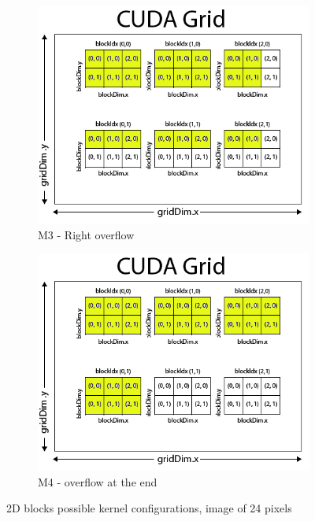 \documentclass[a4paper]{article}
\begin{document}
\begin{figure}[!ht]
\begin{subfigure}{0.5\textwidth}
\centering
\includegraphics[width=\linewidth]{res/M3}
\caption{M3 - Right overflow}
\label{fig:m3}
\end{subfigure}
\begin{subfigure}{0.5\textwidth}
\centering
\includegraphics[width=\linewidth]{res/M4}
\caption{M4 - overflow at the end}
\label{fig:m4}
\end{subfigure}
\caption{2D blocks possible kernel configurations, image of 24 pixels}
 \label{fig:methods34}
\end{figure}
\FloatBarrier
\end{document}
